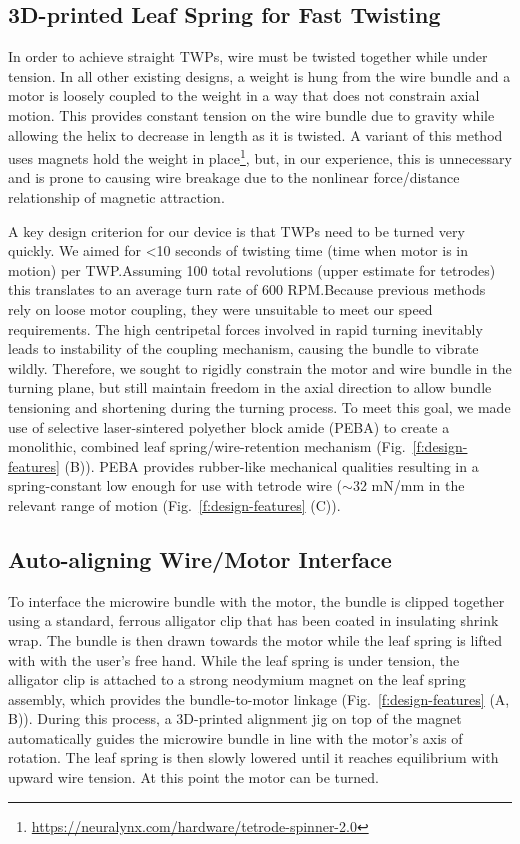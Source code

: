 \documentclass[11pt,a4paper]{article}
\begin{document}
\subsection{3D-printed Leaf Spring for Fast Twisting}
In order to achieve straight TWPs, wire must be twisted together while under
tension. In all other existing designs, a weight is hung from the wire bundle
and a motor is loosely coupled to the weight in a way that does not constrain
axial motion. This provides constant tension on the wire bundle due to gravity
while allowing the helix to decrease in length as it is twisted. A variant of
this method uses magnets hold the weight in
place\footnote{\url{https://neuralynx.com/hardware/tetrode-spinner-2.0}}, but,
in our experience, this is unnecessary and is prone to causing wire breakage
due to the nonlinear force/distance relationship of magnetic attraction.

A key design criterion for our device is that TWPs need to be turned very
quickly. We aimed for <10 seconds of twisting time (time when motor is in
motion) per TWP.\@ Assuming 100 total revolutions (upper estimate for tetrodes)
this translates to an average turn rate of 600 RPM.\@ Because previous methods
rely on loose motor coupling, they were unsuitable to meet our speed
requirements. The high centripetal forces involved in rapid turning inevitably
leads to instability of the coupling mechanism, causing the bundle to vibrate
wildly. Therefore, we sought to rigidly constrain the motor and wire
bundle in the turning plane, but still maintain freedom in the axial direction
to allow bundle tensioning and shortening during the turning process. To meet
this goal, we made use of selective laser-sintered polyether block amide (PEBA)
to create a monolithic, combined leaf spring/wire-retention mechanism
(Fig.~\ref{f:design-features} (B)). PEBA provides rubber-like mechanical
qualities resulting in a spring-constant low enough for use with tetrode wire
($\sim$32 mN/mm in the relevant range of motion (Fig.~\ref{f:design-features}
(C)).

\subsection{Auto-aligning Wire/Motor Interface}
To interface the microwire bundle with the motor, the bundle is clipped
together using a standard, ferrous alligator clip that has been coated in
insulating shrink wrap. The bundle is then drawn towards the motor while the
leaf spring is lifted with with the user's free hand. While the leaf spring is
under tension, the alligator clip is attached to a strong neodymium magnet on
the leaf spring assembly, which provides the bundle-to-motor linkage
(Fig.~\ref{f:design-features} (A, B)). During this process, a 3D-printed
alignment jig on top of the magnet automatically guides the microwire bundle
in line with the motor's axis of rotation. The leaf spring is then slowly
lowered until it reaches equilibrium with upward wire tension. At this point
the motor can be turned.
\end{document}
